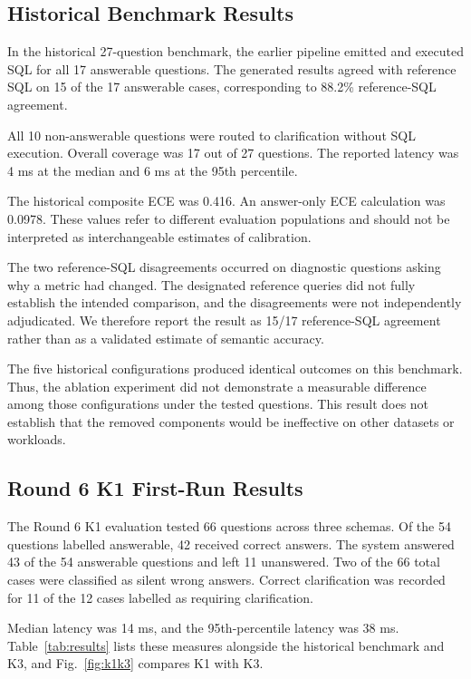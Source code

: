 \documentclass[conference]{IEEEtran}
\begin{document}
\subsection{Historical Benchmark Results}

In the historical 27-question benchmark, the earlier pipeline emitted and executed SQL for all 17 answerable questions. The generated results agreed with reference SQL on 15 of the 17 answerable cases, corresponding to 88.2\% reference-SQL agreement.

All 10 non-answerable questions were routed to clarification without SQL execution. Overall coverage was 17 out of 27 questions. The reported latency was 4 ms at the median and 6 ms at the 95th percentile.

The historical composite ECE was 0.416. An answer-only ECE calculation was 0.0978. These values refer to different evaluation populations and should not be interpreted as interchangeable estimates of calibration.

The two reference-SQL disagreements occurred on diagnostic questions asking why a metric had changed. The designated reference queries did not fully establish the intended comparison, and the disagreements were not independently adjudicated. We therefore report the result as 15/17 reference-SQL agreement rather than as a validated estimate of semantic accuracy.

The five historical configurations produced identical outcomes on this benchmark. Thus, the ablation experiment did not demonstrate a measurable difference among those configurations under the tested questions. This result does not establish that the removed components would be ineffective on other datasets or workloads.

\subsection{Round 6 K1 First-Run Results}

The Round 6 K1 evaluation tested 66 questions across three schemas. Of the 54 questions labelled answerable, 42 received correct answers. The system answered 43 of the 54 answerable questions and left 11 unanswered. Two of the 66 total cases were classified as silent wrong answers. Correct clarification was recorded for 11 of the 12 cases labelled as requiring clarification.

Median latency was 14 ms, and the 95th-percentile latency was 38 ms. Table~\ref{tab:results} lists these measures alongside the historical benchmark and K3, and Fig.~\ref{fig:k1k3} compares K1 with K3.
\end{document}
